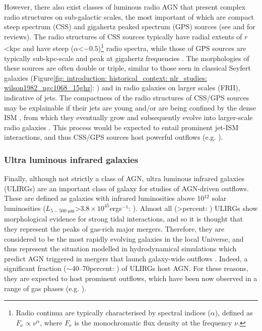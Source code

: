 However, there also exist classes of luminous radio AGN that present complex radio structures on sub-galactic scales, the most important of which are compact steep spectrum (CSS) and gigahertz peaked spectrum (GPS) sources  (see \citealt{ODea1998} and \citealt{ODea2021} for reviews). The radio structures of CSS sources typically have radial extents of $r$\;\textless{}\;kpc and have steep ($\alpha$\;\textless\;$-0.5$)\footnote{Radio continua are typically characterised by spectral indices ($\alpha$), defined as $F_\mathrm{\nu}\propto\nu^\alpha$, where $F_\mathrm{\nu}$ is the monochromatic flux density at the frequency $\nu$.} radio spectra, while those of GPS sources are typically sub-kpc-scale and peak at gigahertz frequencies \citep{Kellermann1981, ODea1998, Callingham2015}. The morphologies of these sources are often double or triple, similar to those seen in classical Seyfert galaxies (Figure\;\ref{fig: introduction: historical_context: nlr_studies: wilson1982_ngc1068_15ghz}: \citealt{Wilson1982}) and in radio galaxies on larger scales (FRII), indicative of jets. The compactness of the radio structures of CSS/GPS sources may be explainable if their jets are young and/or are being confined by the dense ISM \citep{Bicknell1997, Stanghellini2005, ODea2021}, from which they eventually grow and subsequently evolve into larger-scale radio galaxies \citep{Stanghellini2005, Morganti2007, Kukreti2023}. This process would be expected to entail prominent jet-ISM interactions, and thus CSS/GPS sources host powerful outflows (e.g. \citealt{Holt2008, Holt2011, Santoro2020}).

\subsubsection{Ultra luminous infrared galaxies}
\label{section: introduction: outflows: taxonomy_of_agn: ulirgs}

Finally, although not strictly a class of AGN, ultra luminous infrared galaxies (ULIRGs) are an important class of galaxy for studies of AGN-driven outflows. These are defined as galaxies with infrared luminosities above 10$^{12}$ solar luminosities ($L_\mathrm{5-500\;\mu{m}}$\;\textgreater\;$3.8\times10^{45}$\;erg\;s$^{-1}$: \citealt{Sanders1996}). Almost all (\textgreater{}\;per\;cent: \citealt{Veilleux2002}) ULIRGs show morphological evidence for strong tidal interactions, and so it is thought that they represent the peaks of gas-rich major mergers. Therefore, they are considered to be the most rapidly evolving galaxies in the local Universe, and thus represent the situation modelled in hydrodynamical simulations which predict AGN triggered in mergers that launch galaxy-wide outflows \citep{DiMatteo2005, Springel2005, Hopkins2008, Johansson2009}. Indeed, a significant fraction ($\sim$40--70\;per\;cent: \citealt{Kim1998, Veilleux2002, Nardini2010, AlonsoHerrero2012}) of ULIRGs host AGN. For these reasons, they are expected to host prominent outflows, which have been now observed in a range of gas phases (e.g. \citealt{Zaurin2013, Spence2018, Rose2018, Tadhunter2019, Lamperti2022}).

